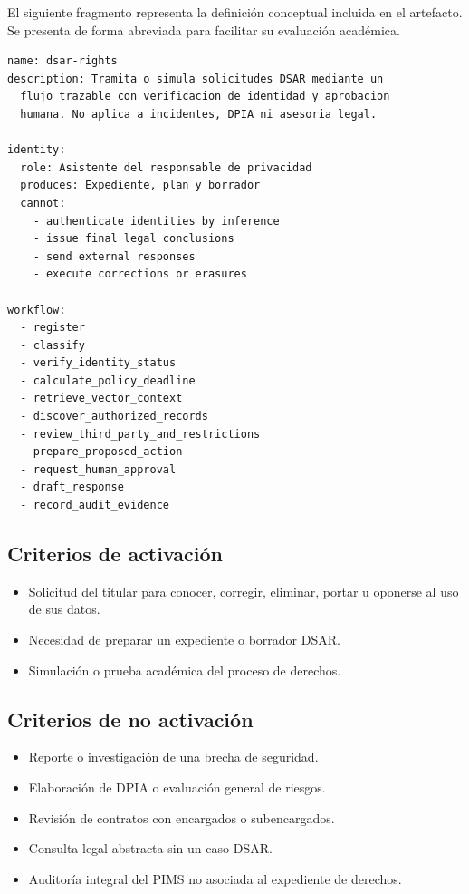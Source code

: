 \documentclass[11pt,a4paper]{article}
\begin{document}
El siguiente fragmento representa la definición conceptual incluida en el artefacto. Se presenta de forma abreviada para facilitar su evaluación académica.

\begin{lstlisting}[language={},caption={Definición abreviada del skill DSAR.}]
name: dsar-rights
description: Tramita o simula solicitudes DSAR mediante un
  flujo trazable con verificacion de identidad y aprobacion
  humana. No aplica a incidentes, DPIA ni asesoria legal.

identity:
  role: Asistente del responsable de privacidad
  produces: Expediente, plan y borrador
  cannot:
    - authenticate identities by inference
    - issue final legal conclusions
    - send external responses
    - execute corrections or erasures

workflow:
  - register
  - classify
  - verify_identity_status
  - calculate_policy_deadline
  - retrieve_vector_context
  - discover_authorized_records
  - review_third_party_and_restrictions
  - prepare_proposed_action
  - request_human_approval
  - draft_response
  - record_audit_evidence
\end{lstlisting}

\subsection{Criterios de activación}

\begin{itemize}
  \item Solicitud del titular para conocer, corregir, eliminar, portar u oponerse al uso de sus datos.
  \item Necesidad de preparar un expediente o borrador DSAR.
  \item Simulación o prueba académica del proceso de derechos.
\end{itemize}

\subsection{Criterios de no activación}

\begin{itemize}
  \item Reporte o investigación de una brecha de seguridad.
  \item Elaboración de DPIA o evaluación general de riesgos.
  \item Revisión de contratos con encargados o subencargados.
  \item Consulta legal abstracta sin un caso DSAR.
  \item Auditoría integral del PIMS no asociada al expediente de derechos.
\end{itemize}
\end{document}
